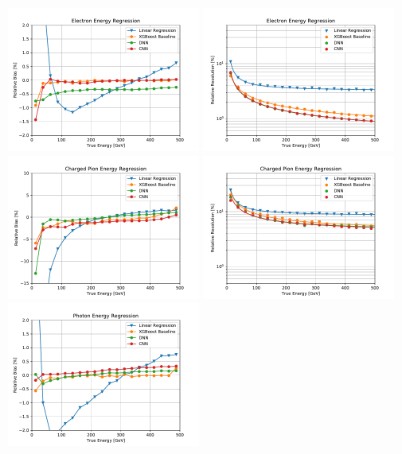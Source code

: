 \begin{figure}[htbp]
\centering
\includegraphics[width=0.45\textwidth]{Images/Calo/bias_vs_E_EleFixed_nn_vs_cnn_zoom.pdf}
\includegraphics[width=0.45\textwidth]{Images/Calo/res_vs_E_EleFixed_nn_vs_cnn_fits.pdf} \\
\includegraphics[width=0.45\textwidth]{Images/Calo/bias_vs_E_ChPiFixed_Cut30_nn_vs_cnn.pdf}
\includegraphics[width=0.45\textwidth]{Images/Calo/res_vs_E_ChPiFixed_Cut30_nn_vs_cnn_fits.pdf} \\
\includegraphics[width=0.45\textwidth]{Images/Calo/bias_vs_E_GammaFixed_nn_vs_cnn_zoom.pdf}

\end{figure}
